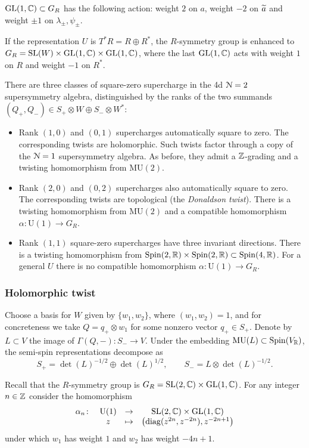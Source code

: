 \documentclass[10pt, oneside]{article}
\newcommand{\MU}{\mathrm{MU}}
\renewcommand{\U}{\mathrm{U}}
\begin{document}
$\mathrm{GL}(1, \mathbb C)\subset G_R$ has the following action: weight $2$ on $a$, weight $-2$ on $\widetilde{a}$ and weight $\pm 1$ on $\lambda_\pm,\psi_\pm$.

If the representation $U$ is $T^*R = R\oplus R^*$, the $R$-symmetry group is enhanced to $G_R=\mathrm{SL}(W)\times \mathrm{GL}(1, \mathbb C)\times \mathrm{GL}(1, \mathbb C)$, where the last $\mathrm{GL}(1, \mathbb C)$ acts with weight $1$ on $R$ and weight $-1$ on $R^*$.

There are three classes of square-zero supercharge in the 4d $\mathcal{N}=2$ supersymmetry algebra, distinguished by the ranks of the two summands $(Q_+,Q_-) \in S_+ \otimes W \oplus S_- \otimes W^*$:
\begin{itemize}
 \item Rank $(1,0)$ and $(0,1)$ supercharges automatically square to zero.  
 The corresponding twists are holomorphic.
 Such twists factor through a copy of the $\mathcal N = 1$ supersymmetry algebra. As before, they admit a $\mathbb Z$-grading and a twisting homomorphism from $\MU(2)$.
 \item Rank $(2,0)$ and $(0,2)$ supercharges also automatically square to zero. The corresponding twists are topological (the \emph{Donaldson twist}). There is a twisting homomorphism from $\MU(2)$ and a compatible homomorphism $\alpha\colon \U(1)\rightarrow G_R$.
 \item Rank $(1,1)$ square-zero supercharges have three invariant directions. There is a twisting homomorphism from $\mathrm{Spin}(2, \mathbb R)\times \mathrm{Spin}(2, \mathbb R)\subset \mathrm{Spin}(4, \mathbb R)$. For a general $U$ there is no compatible homomorphism $\alpha\colon \U(1)\rightarrow G_R$.
\end{itemize}

\subsubsection{Holomorphic twist}
\label{sect:4d_2_holomorphictwist}

Choose a basis for $W$ given by $\{w_1, w_2\}$, where $(w_1, w_2) = 1$, and for concreteness we take $Q=q_+ \otimes w_1$ for some nonzero vector $q_+ \in S_+$. Denote by $L\subset V$ the image of $\Gamma(Q, -)\colon S_-\rightarrow V$. Under the embedding $\MU(L) \subset \Spin(V_\RR)$, the semi-spin representations decompose as
\[
S_+ = \det(L)^{-1/2} \oplus \det(L)^{1/2},\qquad S_- = L \otimes \det(L)^{-1/2} .
\]

Recall that the $R$-symmetry group is $G_R = \mathrm{SL}(2, \mathbb C) \times \mathrm{GL}(1, \mathbb C)$. For any integer $n\in\mathbb Z$ consider the homomorphism 
\[
\begin{array}{ccccc}
\alpha_n \colon & \U(1) & \rightarrow & \SL(2, \CC)\times \GL(1, \CC)\\
&  z & \mapsto & \left({\rm diag}(z^{2n}, z^{-2n}) , z^{-2n+1} \right)
\end{array}
\]
under which $w_1$ has weight $1$ and $w_2$ has weight $-4n+1$.
\end{document}
